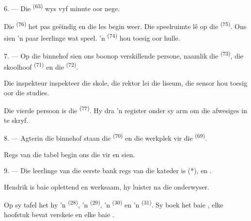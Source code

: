 6. --- Die  \textsuperscript{(63)} wys vyf minute oor nege.

Die  \textsuperscript{(76)} het pas geëindig en die les begin weer. Die
speelruimte lê op die  \textsuperscript{(75)}. Ons sien 'n paar
leerlinge wat speel. 'n  \textsuperscript{(74)} hou toesig oor
hulle.

7. --- Op die binnehof sien ons boonop verskillende persone, naamlik die
 \textsuperscript{(73)}, die skoolhoof 
\textsuperscript{(71)} en die  \textsuperscript{(72)}.

Die inspekteur inspekteer die skole, die rektor lei die liseum, die sensor hou toesig
oor die studies.

Die vierde persoon is die  \textsuperscript{(77)}. Hy dra 'n register
onder sy arm om die afwesiges in te skryf.

8. --- Agterin die binnehof staan die 
\textsuperscript{(70)} en die werkplek vir die 
\textsuperscript{(69)}.

Regs van die tabel begin ons die  vir  en
 sien.


\VUsaut{2.4mm}

\VUsaut{3.0mm}

9. --- Die leerlinge van die eerste bank regs van die kateder is  (*),
 en .

Hendrik is baie oplettend en werksaam, hy luister na die onderwyser.

Op sy tafel het hy 'n  \textsuperscript{(28)}, 'n 
\textsuperscript{(29)}, 'n  \textsuperscript{(30)} en 'n
 \textsuperscript{(31)}. Sy boek het baie , elke
hoofstuk bevat verskeie  en elke  baie .

